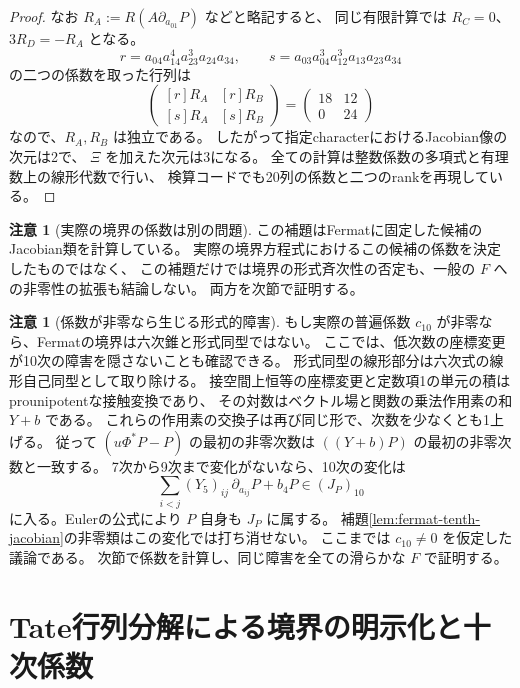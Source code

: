 \documentclass[a4paper,11pt]{ltjsarticle}
\theoremstyle{definition}
\newtheorem{remark}[theorem]{注意}
\begin{document}
\begin{proof}
なお $R_A:=R(A\partial_{a_{01}}P)$ などと略記すると、
同じ有限計算では $R_C=0$、$3R_D=-R_A$ となる。
\[
 r=a_{04}a_{14}^4a_{23}^3a_{24}a_{34},\qquad
 s=a_{03}a_{04}^3a_{12}^3a_{13}a_{23}a_{34}
\]
の二つの係数を取った行列は
\[
 \begin{pmatrix}{[r]R_A} &{[r]R_B}\\{[s]R_A} &{[s]R_B}\end{pmatrix}
                  =\begin{pmatrix}18&12\\0&24\end{pmatrix}
\]
なので、$R_A,R_B$ は独立である。
したがって指定characterにおけるJacobian像の次元は2で、
$\Xi$ を加えた次元は3になる。
全ての計算は整数係数の多項式と有理数上の線形代数で行い、
検算コードでも20列の係数と二つのrankを再現している。
\end{proof}

\begin{remark}[実際の境界の係数は別の問題]
この補題はFermatに固定した候補のJacobian類を計算している。
実際の境界方程式におけるこの候補の係数を決定したものではなく、
この補題だけでは境界の形式斉次性の否定も、一般の $F$ への非零性の拡張も結論しない。
両方を次節で証明する。
\end{remark}

\begin{remark}[係数が非零なら生じる形式的障害]
もし実際の普遍係数 $c_{10}$ が非零なら、Fermatの境界は六次錐と形式同型ではない。
ここでは、低次数の座標変更が10次の障害を隠さないことも確認できる。
形式同型の線形部分は六次式の線形自己同型として取り除ける。
接空間上恒等の座標変更と定数項1の単元の積はprounipotentな接触変換であり、
その対数はベクトル場と関数の乗法作用素の和 $Y+b$ である。
これらの作用素の交換子は再び同じ形で、次数を少なくとも1上げる。
従って $(u\Phi^*P-P)$ の最初の非零次数は $((Y+b)P)$ の最初の非零次数と一致する。
7次から9次まで変化がないなら、10次の変化は
\[
       \sum_{i<j}(Y_5)_{ij}\,\partial_{a_{ij}}P+b_4P
                         \in(J_P)_{10}
\]
に入る。Eulerの公式により $P$ 自身も $J_P$ に属する。
補題\ref{lem:fermat-tenth-jacobian}の非零類はこの変化では打ち消せない。
ここまでは $c_{10}\ne0$ を仮定した議論である。
次節で係数を計算し、同じ障害を全ての滑らかな $F$ で証明する。
\end{remark}

\clearpage
\section{Tate行列分解による境界の明示化と十次係数}
\label{sec:tate-boundary-tenth}
\end{document}
